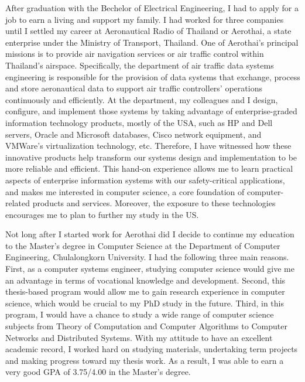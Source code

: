 \documentclass[a4paper,10pt]{report}
\begin{document}
\vspace{0.2cm}
After graduation with the Bechelor of Electrical Engineering, I had to apply for a job to earn a living and support my family. I had worked for three companies until I settled my career at Aeronautical Radio of Thailand or Aerothai, a state enterprise under the Ministry of Transport, Thailand. One of Aerothai's principal missions is to provide air navigation services or air traffic control within Thailand's airspace. Specifically, the department of air traffic data systems engineering is responsible for the provision of data systems that exchange, process and store aeronautical data to support air traffic controllers' operations continuously and efficiently. At the department, my colleagues and I design, configure, and implement those systems by taking advantage of enterprise-graded information technology products, mostly of the USA, such as HP and Dell servers, Oracle and Microsoft databases, Cisco network equipment, and VMWare's virtualization technology, etc. Therefore, I have witnessed how these innovative products help transform our systems design and implementation to be more reliable and efficient. This hand-on experience allows me to learn practical aspects of enterprise information systems with our safety-critical applications, and makes me interested in computer science, a core foundation of computer-related products and services. Moreover, the exposure to these technologies encourages me to plan to further my study in the US.

\vspace{0.2cm}
Not long after I started work for Aerothai did I decide to continue my education to the Master's degree in Computer Science at the Department of Computer Engineering, Chulalongkorn University. I had the following three main reasons. First, as a computer systems engineer, studying computer science would give me an advantage in terms of vocational knowledge and development. Second, this thesis-based program would allow me to gain research experience in computer science, which would be crucial to my PhD study in the future. Third, in this program, I would have a chance to study a wide range of computer science subjects from Theory of Computation and Computer Algorithms to Computer Networks and Distributed Systems. With my attitude to have an excellent academic record, I worked hard on studying materials, undertaking term projects and making progress toward my thesis work. As a result, I was able to earn a very good GPA of 3.75/4.00 in the Master's degree.
\end{document}
